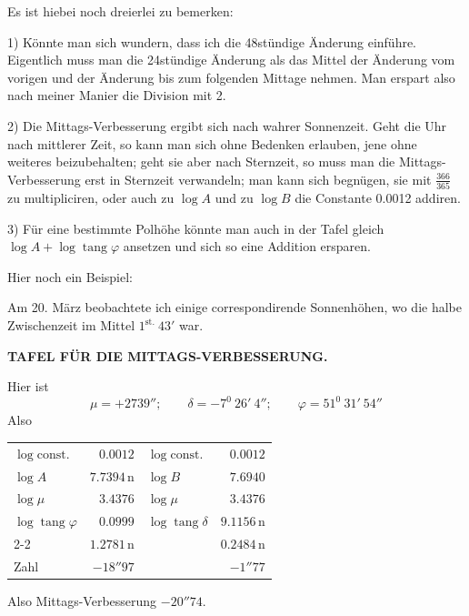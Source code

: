 Es ist hiebei noch dreierlei zu bemerken:

1) Könnte man sich wundern, dass ich die 48stündige Änderung einführe. Eigentlich muss man die 24stündige Änderung als das Mittel der Änderung vom vorigen und der Änderung bis zum folgenden Mittage nehmen. Man erspart also nach meiner Manier die Division mit 2.

2) Die Mittags-Verbesserung ergibt sich nach wahrer Sonnenzeit. Geht die Uhr nach mittlerer Zeit, so kann man sich ohne Bedenken erlauben, jene ohne weiteres beizubehalten; geht sie aber nach Sternzeit, so muss man die Mittags-Verbesserung erst in Sternzeit verwandeln; man kann sich begnügen, sie mit $\frac{366}{365}$ zu multipliciren, oder auch zu $\log A$ und zu $\log B$ die Constante 0.0012 addiren.

3) Für eine bestimmte Polhöhe könnte man auch in der Tafel gleich $\log A+\log\operatorname{tang}\varphi$ ansetzen und sich so eine Addition ersparen.

Hier noch ein Beispiel:

Am 20. März beobachtete ich einige correspondirende Sonnenhöhen, wo die halbe Zwischenzeit im Mittel $1^{\mathrm{st.}}\ 43'$ war.
\par\clearpage
\thispagestyle{empty}
\noindent{}%
%
\parbox[t]{\dimexpr\linewidth-24mm\relax}{\centering\footnotesize\bfseries TAFEL FÜR DIE MITTAGS-VERBESSERUNG.\par}%
\makebox[12mm][r]{}\par\nobreak\medskip
\indent Hier ist
\[
\mu=+2739'';\qquad\delta=-7^0\ 26'\ 4'';\qquad\varphi=51^0\ 31'\ 54''
\]
Also\par\nobreak
\begin{center}
\begin{tabular}{lr@{\qquad\qquad}lr}
$\log\mathrm{const.}$ & $0.0012$ & $\log\mathrm{const.}$ & $0.0012$\\
$\log A$ & $7.7394\,\mathrm n$ & $\log B$ & $7.6940$\\
$\log\mu$ & $3.4376$ & $\log\mu$ & $3.4376$\\
$\log\operatorname{tang}\varphi$ & $0.0999$ & $\log\operatorname{tang}\delta$ & $9.1156\,\mathrm n$\\\cline{2-2}\cline{4-4}
& $1.2781\,\mathrm n$ & & $0.2484\,\mathrm n$\\
Zahl & $-18''97$ & & $-1''77$
\end{tabular}
\end{center}
\noindent Also Mittags-Verbesserung $-20''74$.

